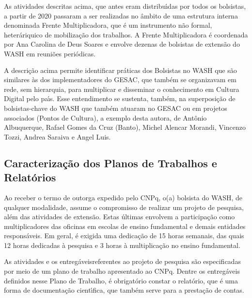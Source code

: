 \documentclass[
12pt,		%
openright,	%
twoside,  %
a4paper,			%
chapter=TITLE,		%
english,			%
french,				%
spanish,			%
brazil				%
]{USPSC-classe/USPSC}
\begin{document}
As atividades descritas acima, que antes eram distribu\'{\i}das por todos os bolsistas, a partir de 2020 passaram a ser realizadas no \^ambito de uma estrutura interna denominada \textquotedbl Frente Multiplicadora\textquotedbl , que \'e um instrumento n\~ao formal, heter\'ariquico de mobiliza\c{c}\~ao dos trabalhos. A Frente Multiplicadora \'e coordenada por Ana Carolina de Deus Soares e envolve dezenas de bolsistas de extens\~ao do WASH em reuni\~oes peri\'odicas.








A descri\c{c}\~ao acima permite identificar pr\'aticas dos Bolsistas no WASH que s\~ao similares \`as dos implementadores do GESAC, que tamb\'em se organizavam em rede, sem hierarquia, para multiplicar e disseminar o conhecimento em Cultura Digital pelo pa\'{\i}s. Esse entendimento se sustenta, tamb\'em, na superposi\c{c}\~ao de bolsistas-chave do WASH que tamb\'em atuaram no GESAC ou em projetos associados (Pontos de Cultura), a exemplo desta autora, de Ant\^onio Albuquerque, Rafael Gomes da Cruz (Banto), Michel Alencar Morandi, Vincenzo Tozzi, Andrea Saraiva e Angel Luis.








\subsection[Caracteriza\c{c}\~ao dos Planos de Trabalhos e Relat\'orios]{Caracteriza\c{c}\~ao dos Planos de Trabalhos e Relat\'orios}\label{Caracteriza\c{c}\~ao dos Planos de Trabalhos e Relat\'orios}
Ao receber o termo de outorga expedido pelo CNPq, o(a) bolsista do WASH, de qualquer modalidade, assume o compromisso de realizar um projeto de pesquisa, al\'em das atividades de extens\~ao. Estas \'ultimas envolvem a participa\c{c}\~ao como multiplicadores das oficinas em escolas de ensino fundamental e demais entidades respons\'aveis. Em geral, \'e exigida uma dedica\c{c}\~ao de 15 horas semanais, das quais 12 horas dedicadas \`a pesquisa e 3 horas \`a multiplica\c{c}\~ao no ensino fundamental.








As atividades e os \textquotedbl entreg\'aveis\textquotedbl  referentes ao projeto de pesquisa s\~ao especificadas por meio de um plano de trabalho apresentado ao CNPq. Dentre os entreg\'aveis definidos nesse Plano de Trabalho, \'e obrigat\'orio constar o relat\'orio, que \'e uma forma de documenta\c{c}\~ao cient\'{\i}fica, que tamb\'em serve para a presta\c{c}\~ao de contas.
\end{document}
